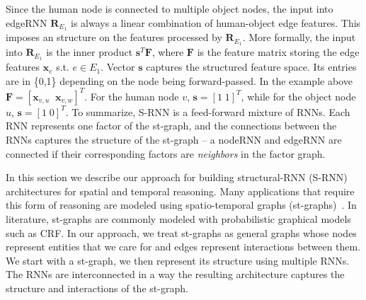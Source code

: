 \documentclass[10pt,twocolumn,letterpaper]{article}
\newcommand{\ve}[1]{\mathbf{#1}}
\newcommand{\todo}[1]{\textcolor{blue}{\textbf{#1}}}
\begin{document}
Since the human node is connected to multiple object nodes, the input into edgeRNN $\ve{R}_{E_1}$ is always a linear combination of  human-object edge features. This imposes an structure on the features processed by $\ve{R}_{E_1}$. More formally, the input into $\ve{R}_{E_1}$ is the inner product $\ve{s}^T\ve{F}$, where $\ve{F}$ is the feature matrix storing the edge features $\ve{x}_e$ s.t. $e \in E_1$. Vector $\ve{s}$ captures  the structured feature space. Its entries are in \{0,1\} depending on the node being forward-passed. In the example above $\ve{F} = [\ve{x}_{v,u}\;\; \ve{x}_{v,w}]^T$. For the human node $v$, $\ve{s}=[1\; 1]^T$, while for the object node $u$, $\ve{s}=[1\; 0]^T$.
To summarize, S-RNN is a feed-forward  mixture of RNNs. Each RNN represents one factor of the st-graph, and the connections between the RNNs captures the structure of the st-graph -- a nodeRNN and edgeRNN are connected if their corresponding factors are \textit{neighbors} in the factor graph.%

In this section we describe our approach for building structural-RNN (S-RNN) architectures for spatial and temporal reasoning. Many applications that  require this form of reasoning are modeled using spatio-temporal graphs (st-graphs)~\cite{X}. In literature, st-graphs are commonly modeled with probabilistic graphical models such as CRF. In our approach, we treat st-graphs as general graphs whose nodes represent entities that we care for and edges represent interactions between them. We start with a st-graph, we then represent its structure using multiple RNNs. The RNNs are interconnected in a way the resulting architecture captures the structure and interactions of the st-graph. 
\end{document}
